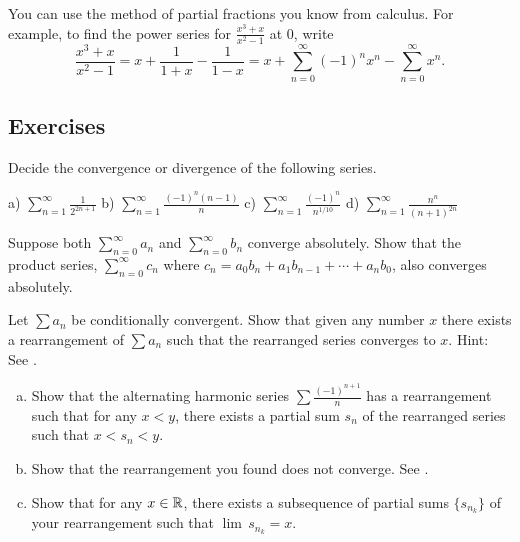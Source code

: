 You can use the method of partial fractions you know from calculus.
For example, to find the power series for $\frac{x^3+x}{x^2-1}$ at 0, write
\begin{equation*}
\frac{x^3+x}{x^2-1}
=
x + \frac{1}{1+x} - \frac{1}{1-x}
=
x + \sum_{n=0}^\infty {(-1)}^n x^n - \sum_{n=0}^\infty x^n .
\end{equation*}

\subsection{Exercises}

\begin{exercise}
Decide the convergence or divergence of the following series.

\medskip

\noindent
a)
$\displaystyle \sum_{n=1}^\infty \frac{1}{2^{2n+1}}$
\qquad
b)
$\displaystyle \sum_{n=1}^\infty \frac{{(-1)}^{n}(n-1)}{n}$
\qquad
c)
$\displaystyle \sum_{n=1}^\infty \frac{{(-1)}^n}{n^{1/10}}$
\qquad
d)
$\displaystyle \sum_{n=1}^\infty \frac{n^n}{{(n+1)}^{2n}}$
\end{exercise}

\begin{exercise}
Suppose both $\sum_{n=0}^\infty a_n$ and $\sum_{n=0}^\infty b_n$ 
converge absolutely.
Show that the product series, $\sum_{n=0}^\infty c_n$ where
$c_n = a_0 b_n + a_1 b_{n-1} + \cdots + a_n b_0$, also converges absolutely.
\end{exercise}

\begin{exercise}[Challenging] \label{exercise:seriesconvergestoanything}
Let $\sum a_n$ be conditionally convergent.
Show that given any number $x$
there exists a rearrangement of $\sum a_n$
such that the rearranged series converges to $x$.
Hint: See .
\end{exercise}

\begin{exercise}
\leavevmode
\begin{enumerate}[a)]
\item
Show that the alternating harmonic series $\sum
\frac{{(-1)}^{n+1}}{n}$ has a rearrangement
such that for any $x < y$, there exists a partial sum $s_n$
of the rearranged series such that $x < s_n < y$.
\item
Show that the rearrangement you found does not converge.
See .
\item
Show that for any $x \in {\mathbb{R}}$, there exists a subsequence of
partial sums $\{ s_{n_k} \}$ of your rearrangement such that 
$\lim \, s_{n_k} = x$.
\end{enumerate}
\end{exercise}

